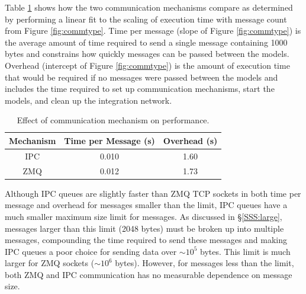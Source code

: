 \documentclass[journal]{IEEEtran}
\begin{document}
Table \ref{tab:commtype} shows how the two communication mechanisms compare as determined by performing a linear fit to the scaling of execution time with message count from Figure \ref{fig:commtype}. Time per message (slope of Figure \ref{fig:commtype}) is the average amount of time required to send a single message containing 1000 bytes and constrains how quickly messages can be passed between the models. Overhead (intercept of Figure \ref{fig:commtype}) is the amount of execution time that would be required if no messages were passed between the models and includes the time required to set up communication mechanisms, start the models, and clean up the integration network.
%
\begin{table}[htbp]
\begin{center}
\begin{tabular}{|c|c|c|}
\hline
Mechanism	& Time per Message (s) 	& Overhead (s) 	\\\hline
IPC			& 0.010				& 1.60			\\
ZMQ 		& 0.012				& 1.73			\\\hline
\end{tabular}
\end{center}
\caption{Effect of communication mechanism on performance.}
\label{tab:commtype}
\end{table}%
%
Although IPC queues are slightly faster than ZMQ TCP sockets in both time per message and overhead for messages smaller than the limit, IPC queues have a much smaller maximum size limit for messages. As discussed in \S\ref{SSS:large}, messages larger than this limit (2048 bytes) must be broken up into multiple messages, compounding the time required to send these messages and making IPC queues a poor choice for sending data over $\sim10^5$ bytes. This limit is much larger for ZMQ sockets ($\sim10^6$ bytes). However, for messages less than the limit, both ZMQ and IPC communication has no measurable dependence on message size.

\end{document}
